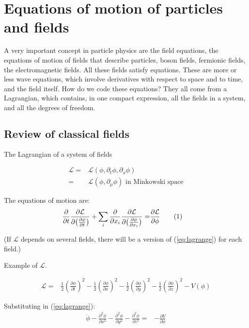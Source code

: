 \documentclass[]{article}
\newcommand\numberthis{\addtocounter{equation}{1}\tag{\theequation}}
\begin{document}
\section{Equations of motion of particles and fields}\label{sect:equation:motion}

A very important concept in particle physics are the field equations, the equations of motion of fields that describe particles, boson fields, fermionic fields, the electromagnetic fields. All these fields satisfy equations. These are more or less wave equations, which involve derivatives with respect to space and to time, and the field itself. How do we code these equations? They all come from a Lagrangian, which contains, in one compact expression, all the fields in a system, and all the degrees of freedom.

\subsection{Review of classical fields}

The Lagrangian of a system of fields

\begin{align*}
	\mathcal{L}=& \mathcal{L}(\phi,\partial_t \phi, \partial_x \phi)\\
	=&\mathcal{L}(\phi,\partial_{\mu} \phi) \text{ in Minkowski space}
\end{align*}

The equations of motion are:
\begin{align*}
	\frac{\partial}{\partial t} \frac{\partial \mathcal{L}}{\partial \big(\frac{\partial \phi}{\partial t}\big)}+\sum_i \frac{\partial}{\partial x_i} \frac{\partial \mathcal{L}}{\partial \big(\frac{\partial \phi}{\partial x_i}\big)}=&\frac{\partial \mathcal{L}}{\partial \phi} \numberthis \label{eq:lagrange}
\end{align*}

(If $\mathcal{L}$ depends on several fields, there will be a version of (\ref{eq:lagrange})  for each field.)

Example of $\mathcal{L}$.

\begin{align*}
	\mathcal{L} =& \frac{1}{2} (\frac{\partial \phi}{\partial t})^2 - \frac{1}{2} (\frac{\partial \phi}{\partial x})^2 - \frac{1}{2} (\frac{\partial \phi}{\partial y})^2 - \frac{1}{2} (\frac{\partial \phi}{\partial z})^2 - V(\phi)
\end{align*}

Substituting in (\ref{eq:lagrange}):
\begin{align*}
	\ddot{\phi} - \frac{\partial^2 \phi}{\partial x^2}  - \frac{\partial^2 \phi}{\partial y^2}  - \frac{\partial^2 \phi}{\partial z^2} =& - \frac{\partial V}{\partial \phi}
\end{align*}
\end{document}

